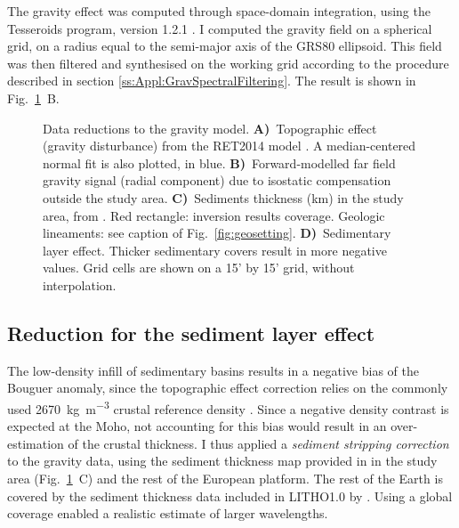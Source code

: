 The gravity effect was computed through space-domain integration, using the Tesseroids program, version {1.2.1} \parencites{Uieda2016}{UiedaTesseroids}.
I computed the gravity field on a spherical grid, on a radius equal to the semi-major axis of the {GRS80} ellipsoid.
This field was then filtered and synthesised on the working grid according to the procedure described in section \ref{ss:Appl:GravSpectralFiltering}.
The result is shown in Fig.~\ref{fig:g_red}~B.

\begin{figure}
    \begin{adjustbox}{center}
    \end{adjustbox}
	\caption[Data reductions to the gravity model.]{Data reductions to the gravity model.
	\textbf{A)}~Topographic effect (gravity disturbance) from the {RET2014} model \parencite{Rexer2016}. A median-centered normal fit is also plotted, in blue.
	\textbf{B)}~Forward-modelled far field gravity signal (radial component) due to isostatic compensation outside the study area.
	\textbf{C)}~Sediments thickness (km) in the study area, from \textcite{Tesauro2008}. Red rectangle: inversion results coverage. Geologic lineaments: see caption of Fig.~\ref{fig:geosetting}.
	\textbf{D)}~Sedimentary layer effect. Thicker sedimentary covers result in more negative values.
	Grid cells are shown on a 15' by 15' grid, without interpolation.}
	\label{fig:g_red}
\end{figure}

\subsection{Reduction for the sediment layer effect}
\label{ss:Appl:GravSed}
The low-density infill of sedimentary basins results in a negative bias of the Bouguer anomaly, since the topographic effect correction relies on the commonly used 2670~\si{\kilo \gram \per \cubic \metre} crustal reference density \parencite{Hinze2003}.
Since a negative density contrast is expected at the Moho, not accounting for this bias would result in an over-estimation of the crustal thickness.
I thus applied a \textit{sediment stripping correction} \parencite{Chen2014} to the gravity data, using the sediment thickness map provided in \textcite{Tesauro2008} in the study area (Fig.~\ref{fig:g_red}~C) and the rest of the European platform.
The rest of the Earth is covered by the sediment thickness data included in {LITHO1.0} by \textcite{Pasyanos2014}.
Using a global coverage enabled a realistic estimate of larger wavelengths.


